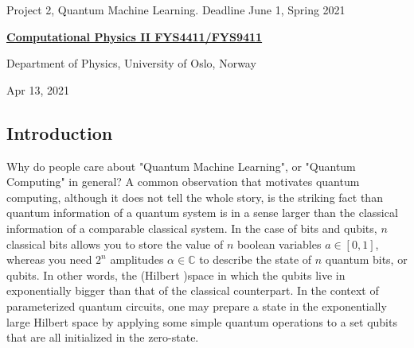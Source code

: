 \documentclass[%
oneside,                 %
final,                   %
10pt]{article}
\begin{document}

\newcommand{\exercisesection}[1]{\subsection*{#1}}






\thispagestyle{empty}

\begin{center}
{\LARGE\bf
\begin{spacing}{1.25}
Project 2, Quantum Machine Learning. Deadline June 1, Spring 2021
\end{spacing}
}
\end{center}


\begin{center}
{\bf \href{{http://www.uio.no/studier/emner/matnat/fys/FYS4411/index-eng.html}}{Computational Physics II FYS4411/FYS9411}}
\end{center}

    \begin{center}
\centerline{{\small Department of Physics, University of Oslo, Norway}}
\end{center}
    

\begin{center}
Apr 13, 2021
\end{center}

\vspace{1cm}


\subsection*{Introduction}

Why do people care about "Quantum Machine Learning", or "Quantum Computing" in general? A common observation that motivates quantum computing,
although it does not tell the whole story, is the striking fact than quantum information of a quantum system is in a sense
larger than the classical information of a comparable classical system. In the case of
bits and qubits, $n$ classical bits allows you to store the value of $n$ boolean variables $a \in [0,1]$,
whereas you need $2^n$ amplitudes $\alpha \in \mathbb{C}$ to describe the state of $n$ quantum bits, or qubits.
In other words, the (Hilbert )space in which the qubits live in exponentially bigger than that of the classical
counterpart. In the context of parameterized quantum circuits, one may prepare a state in the exponentially
large Hilbert space by applying some simple quantum operations to a set qubits that are all initialized in the zero-state.
\end{document}
